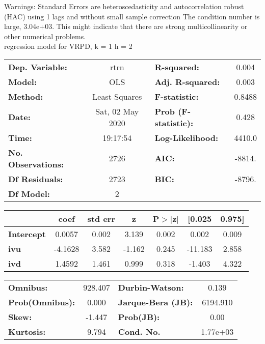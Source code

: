 Warnings: \newline
 [1] Standard Errors are heteroscedasticity and autocorrelation robust (HAC) using 1 lags and without small sample correction \newline
 [2] The condition number is large, 3.04e+03. This might indicate that there are \newline
 strong multicollinearity or other numerical problems.\\ 

regression model for VRPD, k = 1 h = 2\begin{center}
\begin{tabular}{lclc}
\toprule
\textbf{Dep. Variable:}    &       rtrn       & \textbf{  R-squared:         } &     0.004   \\
\textbf{Model:}            &       OLS        & \textbf{  Adj. R-squared:    } &     0.003   \\
\textbf{Method:}           &  Least Squares   & \textbf{  F-statistic:       } &    0.8488   \\
\textbf{Date:}             & Sat, 02 May 2020 & \textbf{  Prob (F-statistic):} &    0.428    \\
\textbf{Time:}             &     19:17:54     & \textbf{  Log-Likelihood:    } &    4410.0   \\
\textbf{No. Observations:} &        2726      & \textbf{  AIC:               } &    -8814.   \\
\textbf{Df Residuals:}     &        2723      & \textbf{  BIC:               } &    -8796.   \\
\textbf{Df Model:}         &           2      & \textbf{                     } &             \\
\bottomrule
\end{tabular}
\begin{tabular}{lcccccc}
                   & \textbf{coef} & \textbf{std err} & \textbf{z} & \textbf{P$> |$z$|$} & \textbf{[0.025} & \textbf{0.975]}  \\
\midrule
\textbf{Intercept} &       0.0057  &        0.002     &     3.139  &         0.002        &        0.002    &        0.009     \\
\textbf{ivu}       &      -4.1628  &        3.582     &    -1.162  &         0.245        &      -11.183    &        2.858     \\
\textbf{ivd}       &       1.4592  &        1.461     &     0.999  &         0.318        &       -1.403    &        4.322     \\
\bottomrule
\end{tabular}
\begin{tabular}{lclc}
\textbf{Omnibus:}       & 928.407 & \textbf{  Durbin-Watson:     } &    0.139  \\
\textbf{Prob(Omnibus):} &   0.000 & \textbf{  Jarque-Bera (JB):  } & 6194.910  \\
\textbf{Skew:}          &  -1.447 & \textbf{  Prob(JB):          } &     0.00  \\
\textbf{Kurtosis:}      &   9.794 & \textbf{  Cond. No.          } & 1.77e+03  \\
\bottomrule
\end{tabular}
\end{center}

